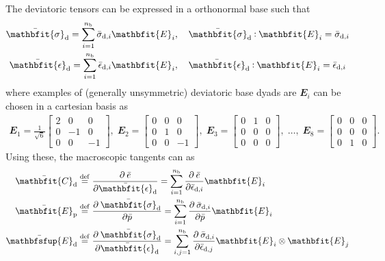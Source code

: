 \documentclass[12pt,a4paper]{article}
\renewcommand{\ts}[1]{\mathbfit{#1}}
\renewcommand{\tf}[1]{\mathbfsfup{#1}}
\renewcommand{\dev}{\mathrm{d}}
\newcommand{\ded}{\mathrm{d}}
\newcommand{\dep}{\mathrm{p}}
\begin{document}
The deviatoric tensors can be expressed in a orthonormal base such that
\begin{subequations}
\begin{gather}
 \bar{\ts\sigma}_\dev = \sum_{i=1}^{n_{\mathrm{b}}} \bar{\sigma}_{\dev,i} \ts E_i,\quad \bar{\ts\sigma}_\dev \dprod \ts E_i = \bar{\sigma}_{\dev,i}
\label{eq:sigma_base} \\
 \bar{\ts\epsilon}_\dev = \sum_{i=1}^{n_{\mathrm{b}}} \bar{\epsilon}_{\dev,i} \ts E_i,\quad \bar{\ts\epsilon}_\dev \dprod \ts E_i = \bar{\epsilon}_{\dev,i}
\label{eq:d_base}
\end{gather}
\end{subequations}
where examples of (generally unsymmetric) deviatoric base dyads are $\ts E_i$ can be chosen in a cartesian basis as
\begin{equation}
\begin{gathered}
 \ts E_1 = \frac{1}{\sqrt{6}}\left[\begin{smallmatrix} 2 & 0 & 0\\ 0 & -1 & 0\\ 0 & 0 & -1\end{smallmatrix}\right],\;
 \ts E_2 = \left[\begin{smallmatrix} 0 & 0 & 0\\ 0 & 1 & 0 \\ 0 & 0 & -1\end{smallmatrix}\right],\;
 \ts E_3 = \left[\begin{smallmatrix} 0 & 1 & 0\\ 0 & 0 & 0 \\ 0 & 0 & 0\end{smallmatrix}\right],\;
 \ldots,\;
 \ts E_8 = \left[\begin{smallmatrix} 0 & 0 & 0\\ 0 & 0 & 0 \\ 0 & 1 & 0\end{smallmatrix}\right].
\end{gathered}
\end{equation}
Using these, the macroscopic tangents can as
\begin{align}
 \bar{\ts C}_\ded \defeq \;&\pd{\bar{e}}{\bar{\ts\epsilon}_\dev} = \sum_{i=1}^{n_\mathrm{b}} \pd{\bar{e}}{\bar{\epsilon}_{\dev,i}} \ts E_i\\
 \bar{\ts E}_\dep \defeq \;&\pd{\bar{\ts\sigma}_\dev}{\bar{p}} = \sum_{i=1}^{n_\mathrm{b}} \pd{\bar{\sigma}_{\dev,i}}{\bar{p}} \ts E_i\\
 \bar{\tf E}_\ded \defeq \;&\pd{\bar{\ts\sigma}_\dev}{\bar{\ts\epsilon}_\dev} =  \sum_{i,j=1}^{n_\mathrm{b}} \pd{\bar{\sigma}_{\dev,i}}{\bar{\epsilon}_{\dev,j}} \ts E_i \outerp \ts E_j
\end{align}
\end{document}
